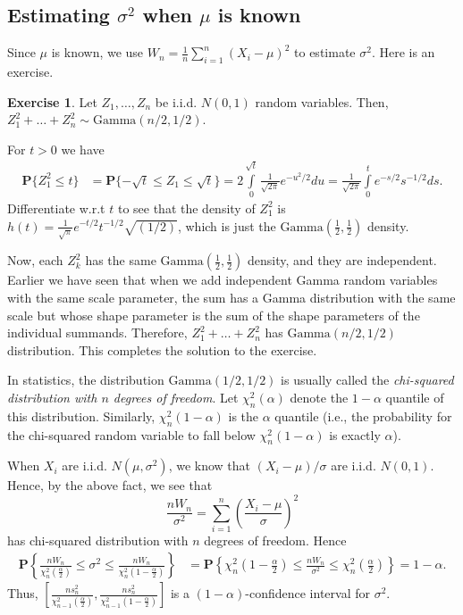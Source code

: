 \documentclass[preprint,  11pt]{amsart}
\theoremstyle{plain} %
\theoremstyle{definition} %
\newtheorem{exercise}[theorem]{Exercise}
\begin{document}
\subsection{Estimating ${\sigma}^{2}$ when $\mu$ is known}
Since $\mu$ is known, we use $W_{n}=\frac{1}{n}\sum_{i=1}^{n}(X_{i}-\mu)^{2}$ to estimate ${\sigma}^{2}$. Here is an exercise.
\begin{exercise} Let $Z_{1},\ldots ,Z_{n}$ be i.i.d. $N(0,1)$ random variables. Then, $Z_{1}^{2}+\ldots +Z_{n}^{2}\sim \mbox{Gamma}(n/2,1/2)$. 
\end{exercise}
 For $t>0$ we have
\begin{align*}
\mathbf{P}\{Z_{1}^{2}\le t\} &= \mathbf{P}\{-\sqrt{t}\le Z_{1}\le \sqrt{t}\} 
= 2\int\limits_{0}^{\sqrt{t}}\frac{1}{\sqrt{2\pi}}e^{-u^{2}/2}du = \frac{1}{\sqrt{2\pi}}\int\limits_{0}^{t}e^{-s/2}s^{-1/2}ds.
\end{align*}
Differentiate w.r.t $t$ to see that the density of $Z_{1}^{2}$ is $h(t)=\frac{1}{\sqrt{\pi}}e^{-t/2}t^{-1/2}\sqrt{(1/2)}$, which is just the $\mbox{Gamma}(\frac{1}{2},\frac{1}{2})$ density. 

Now, each $Z_{k}^{2}$ has the same $\mbox{Gamma}(\frac{1}{2},\frac{1}{2})$ density, and they are independent. Earlier we have seen that when we add independent Gamma random variables with the same scale parameter, the sum has a Gamma distribution with the same scale but whose shape parameter is the sum of the shape parameters of the individual summands. Therefore, $Z_{1}^{2}+\ldots +Z_{n}^{2}$ has $\mbox{Gamma}(n/2,1/2)$ distribution. This completes the solution to the exercise.

\medskip


In statistics, the distribution $\mbox{Gamma}(1/2,1/2)$ is usually called the {\em chi-squared distribution with $n$ degrees of freedom}. Let $\chi_{n}^{2}\left(\alpha\right)$ denote the $1-\alpha$ quantile of this distribution. Similarly, $\chi_{n}^{2}\left(1-\alpha\right)$ is the $\alpha$ quantile (i.e., the probability for the chi-squared random variable to fall below $\chi_{n}^{2}\left(1-\alpha\right)$ is exactly $\alpha$).

When $X_{i}$ are i.i.d. $N(\mu,{\sigma}^{2})$, we know that $(X_{i}-\mu)/{\sigma}$ are i.i.d. $N(0,1)$. Hence, by the above fact, we see that
$$
 \frac{nW_{n}}{{\sigma}^{2}}=\sum_{i=1}^{n}\left(\frac{X_{i}-\mu}{{\sigma}}\right)^{2} 
$$
has chi-squared distribution with $n$ degrees of freedom. Hence
\begin{align*}
\mathbf{P}\left\{   \frac{nW_{n}}{\chi_{n}^{2}\left(\frac{\alpha}{2}\right)} \le {\sigma}^{2}\le \frac{nW_{n}}{\chi_{n}^{2}\left(1-\frac{\alpha}{2}\right)}\right\}&=\mathbf{P}\left\{ \chi_{n}^{2}\left(1-\frac{\alpha}{2}\right) \le \frac{nW_{n}}{{\sigma}^{2}} \le \chi_{n}^{2}\left(\frac{\alpha}{2}\right)\right\}=1-\alpha.
\end{align*}
 Thus, $\left[\frac{ns_{n}^{2}}{\chi_{n-1}^{2}\left(\frac{\alpha}{2}\right)},\frac{ns_{n}^{2}}{\chi_{n-1}^{2}\left(1-\frac{\alpha}{2}\right)}\right]$ is a $(1-\alpha)$-confidence interval for ${\sigma}^{2}$.
\end{document}

